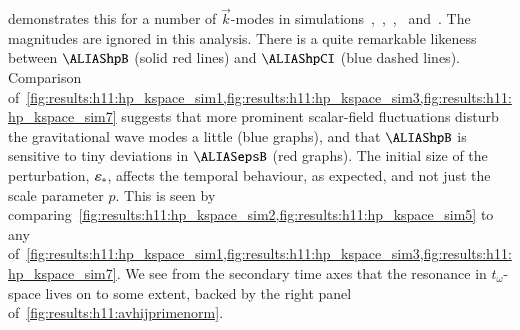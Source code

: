      demonstrates this for a number of $\vec{k}$-modes in simulations~,~,~,~ and~. The magnitudes are ignored in this analysis. There is a quite remarkable likeness between $\hpB$ (solid red lines) and $\hpCI$ (blue dashed lines). Comparison of~\cref{fig:results:h11:hp_kspace_sim1,fig:results:h11:hp_kspace_sim3,fig:results:h11:hp_kspace_sim7} suggests that more prominent scalar-field fluctuations disturb the gravitational wave modes a little (blue graphs), and that $\hpB$ is sensitive to tiny deviations in $\epsB$ (red graphs). %
    The initial size of the perturbation, $\varepsilon_\ast$, affects the temporal behaviour, as expected, and not just the scale parameter $p$. This is seen by comparing~\cref{fig:results:h11:hp_kspace_sim2,fig:results:h11:hp_kspace_sim5} to any of~\cref{fig:results:h11:hp_kspace_sim1,fig:results:h11:hp_kspace_sim3,fig:results:h11:hp_kspace_sim7}. We see from the secondary time axes that the resonance in $t_\omega$-space lives on to some extent, backed by the right panel of~\cref{fig:results:h11:avhijprimenorm}.


